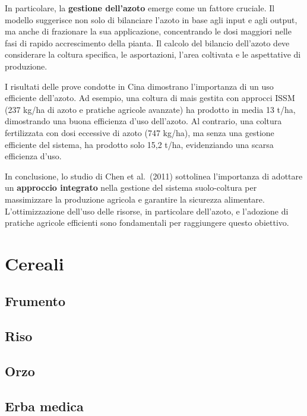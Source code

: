 \documentclass[
]{book}
\theoremstyle{definition}
\theoremstyle{definition}
\theoremstyle{definition}
\theoremstyle{definition}
\theoremstyle{remark}
\begin{document}
In particolare, la \textbf{gestione dell'azoto} emerge come un fattore cruciale. Il modello suggerisce non solo di bilanciare l'azoto in base agli input e agli output, ma anche di frazionare la sua applicazione, concentrando le dosi maggiori nelle fasi di rapido accrescimento della pianta. Il calcolo del bilancio dell'azoto deve considerare la coltura specifica, le asportazioni, l'area coltivata e le aspettative di produzione.

I risultati delle prove condotte in Cina dimostrano l'importanza di un uso efficiente dell'azoto. Ad esempio, una coltura di mais gestita con approcci ISSM (237 kg/ha di azoto e pratiche agricole avanzate) ha prodotto in media 13 t/ha, dimostrando una buona efficienza d'uso dell'azoto. Al contrario, una coltura fertilizzata con dosi eccessive di azoto (747 kg/ha), ma senza una gestione efficiente del sistema, ha prodotto solo 15,2 t/ha, evidenziando una scarsa efficienza d'uso.

In conclusione, lo studio di Chen et al.~(2011) sottolinea l'importanza di adottare un \textbf{approccio integrato} nella gestione del sistema suolo-coltura per massimizzare la produzione agricola e garantire la sicurezza alimentare. L'ottimizzazione dell'uso delle risorse, in particolare dell'azoto, e l'adozione di pratiche agricole efficienti sono fondamentali per raggiungere questo obiettivo.

\hypertarget{cereali}{%
\section{Cereali}\label{cereali}}

\hypertarget{frumento}{%
\subsection{Frumento}\label{frumento}}

\hypertarget{riso}{%
\subsection{Riso}\label{riso}}

\hypertarget{orzo}{%
\subsection{Orzo}\label{orzo}}

\hypertarget{erba-medica}{%
\subsection{Erba medica}\label{erba-medica}}
\end{document}
